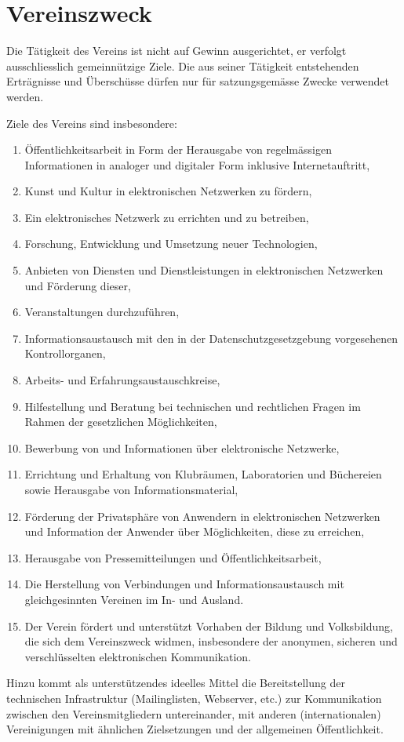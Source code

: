 \documentclass[a4paper,12pt]{article}
\begin{document}
	\section{Vereinszweck}
		\label{sec:zweck}
		Die Tätigkeit des Vereins ist nicht auf Gewinn ausgerichtet, er verfolgt ausschliesslich gemeinnützige
		Ziele. Die aus seiner Tätigkeit entstehenden Erträgnisse und Überschüsse dürfen nur für
		satzungsgemässe Zwecke verwendet werden.\par
		Ziele des Vereins sind insbesondere:
		\begin{enumerate}
			\item Öffentlichkeitsarbeit in Form der Herausgabe von regelmässigen Informationen in analoger und digitaler Form inklusive
			Internetauftritt,
			\item Kunst und Kultur in elektronischen Netzwerken zu fördern,
			\item Ein elektronisches Netzwerk zu errichten und zu betreiben,
			\item Forschung, Entwicklung und Umsetzung neuer Technologien,
			\item Anbieten von Diensten und Dienstleistungen in elektronischen Netzwerken und Förderung dieser,
			\item Veranstaltungen durchzuführen,
			\item Informationsaustausch mit den in der Datenschutzgesetzgebung vorgesehenen Kontrollorganen,
			\item Arbeits- und Erfahrungsaustauschkreise,
			\item Hilfestellung und Beratung bei technischen und rechtlichen Fragen im Rahmen der gesetzlichen Möglichkeiten,
			\item Bewerbung von und Informationen über elektronische Netzwerke,
			\item Errichtung und Erhaltung von Klubräumen, Laboratorien und Büchereien sowie Herausgabe von Informationsmaterial,
			\item Förderung der Privatsphäre von Anwendern in elektronischen Netzwerken und Information der Anwender über Möglichkeiten, diese zu erreichen,
			\item Herausgabe von Pressemitteilungen und Öffentlichkeitsarbeit,
			\item Die Herstellung von Verbindungen und Informationsaustausch mit gleichgesinnten Vereinen im In- und Ausland.
			\item Der Verein fördert und unterstützt Vorhaben der Bildung und Volksbildung, die sich dem Vereinszweck widmen, insbesondere der anonymen, sicheren und verschlüsselten elektronischen Kommunikation.
		\end{enumerate}
		Hinzu kommt als unterstützendes ideelles Mittel die Bereitstellung der technischen Infrastruktur (Mailinglisten, Webserver, etc.) zur Kommunikation zwischen den Vereinsmitgliedern untereinander, mit anderen (internationalen) Vereinigungen mit ähnlichen Zielsetzungen und der allgemeinen Öffentlichkeit.
\end{document}
